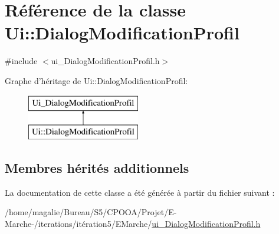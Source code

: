 \hypertarget{class_ui_1_1_dialog_modification_profil}{\section{Référence de la classe Ui\-:\-:Dialog\-Modification\-Profil}
\label{class_ui_1_1_dialog_modification_profil}
}


{\ttfamily \#include $<$ui\-\_\-\-Dialog\-Modification\-Profil.\-h$>$}

Graphe d'héritage de Ui\-:\-:Dialog\-Modification\-Profil\-:\begin{figure}[H]
\begin{center}
\leavevmode
\includegraphics[height=2.000000cm]{class_ui_1_1_dialog_modification_profil}
\end{center}
\end{figure}
\subsection*{Membres hérités additionnels}


La documentation de cette classe a été générée à partir du fichier suivant \-:\begin{DoxyCompactItemize}
\item 
/home/magalie/\-Bureau/\-S5/\-C\-P\-O\-O\-A/\-Projet/\-E-\/\-Marche-\//iterations/itération5/\-E\-Marche/\hyperlink{ui___dialog_modification_profil_8h}{ui\-\_\-\-Dialog\-Modification\-Profil.\-h}\end{DoxyCompactItemize}
